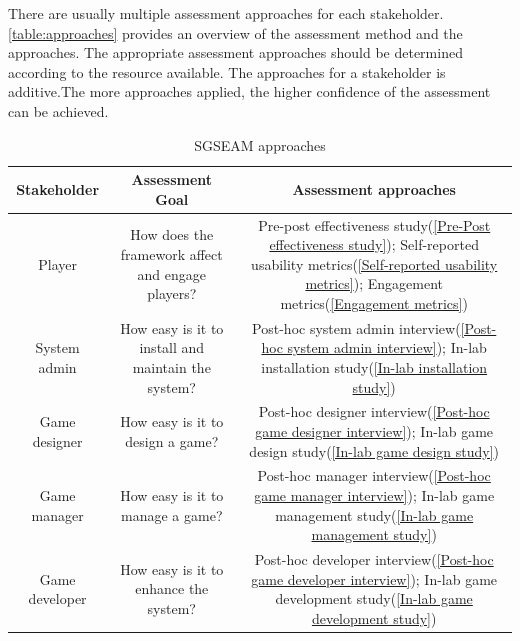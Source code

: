 \documentclass[11pt,oneside]{book}
\newcommand\tabhead[1]{\small\textbf{#1}}
\begin{document}
There are usually multiple assessment approaches for each stakeholder.  \autoref{table:approaches} provides an overview of the assessment method and the approaches. The appropriate assessment approaches should be determined according to the resource available. The approaches for a stakeholder is additive.The more approaches applied, the higher confidence of the assessment can be achieved. 

\begin{table}[ht!]
  \centering
  \begin{tabular}{|c|c|c|}
    \hline
    \multicolumn{1}{|p{0.18\columnwidth}|}{\centering\tabhead{Stakeholder}} &
    \multicolumn{1}{|p{0.28\columnwidth}|}{\centering\tabhead{Assessment Goal}} &
    \multicolumn{1}{|p{0.45\columnwidth}|}{\centering\tabhead{Assessment approaches}} \\
    \hline
    \multicolumn{1}{|p{0.18\columnwidth}|}{Player} &
    \multicolumn{1}{|p{0.28\columnwidth}|}{How does the framework affect and engage players?} &
    \multicolumn{1}{|p{0.45\columnwidth}|}{
    	Pre-post effectiveness study(\ref{Pre-Post effectiveness study});\newline
	Self-reported usability metrics(\ref{Self-reported usability metrics});\newline
	Engagement metrics(\ref{Engagement metrics})} \\
    \hline
    \multicolumn{1}{|p{0.18\columnwidth}|}{System admin} &
    \multicolumn{1}{|p{0.28\columnwidth}|}{How easy is it to install and maintain the system?} &
    \multicolumn{1}{|p{0.45\columnwidth}|}{
    	Post-hoc system admin interview(\ref{Post-hoc system admin interview});\newline
	In-lab installation study(\ref{In-lab installation study})} \\
    \hline
    \multicolumn{1}{|p{0.18\columnwidth}|}{Game designer} &
    \multicolumn{1}{|p{0.28\columnwidth}|}{How easy is it to design a game?} &
    \multicolumn{1}{|p{0.45\columnwidth}|}{
    	Post-hoc designer interview(\ref{Post-hoc game designer interview});\newline
	In-lab game design study(\ref{In-lab game design study})}\\
    \hline
    \multicolumn{1}{|p{0.18\columnwidth}|}{Game manager} &
    \multicolumn{1}{|p{0.28\columnwidth}|}{How easy is it to manage a game?} &
    \multicolumn{1}{|p{0.45\columnwidth}|}{
    	Post-hoc manager interview(\ref{Post-hoc game manager interview});\newline
	In-lab game management study(\ref{In-lab game management study})}\\
    \hline
    \multicolumn{1}{|p{0.18\columnwidth}|}{Game developer} &
    \multicolumn{1}{|p{0.28\columnwidth}|}{How easy is it to enhance the system?} &
    \multicolumn{1}{|p{0.45\columnwidth}|}{
    	Post-hoc developer interview(\ref{Post-hoc game developer interview});\newline
	In-lab game development study(\ref{In-lab game development study})} \\
    \hline
  \end{tabular}
  \caption{SGSEAM approaches}
  \label{table:approaches}
\end{table}
\end{document}
